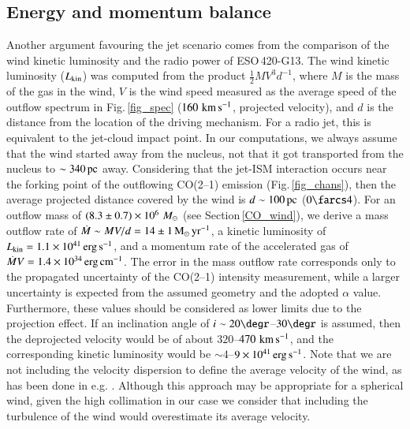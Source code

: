 \documentclass[longauth]{aa}
\newcommand{\msun}{\,\hbox{$M_{\odot}$}}
\newcommand{\kms}{\,\hbox{\hbox{km}\,\hbox{s}$^{-1}$}}
\begin{document}
\subsection{Energy and momentum balance}
Another argument favouring the jet scenario comes from the comparison of the wind kinetic luminosity and the radio power of ESO\,420-G13. The wind kinetic luminosity ($L_{\rm kin}$) was computed from the product $\frac{1}{2} M V^{3} d^{-1}$, where $M$ is the mass of the gas in the wind, $V$ is the wind speed measured as the average speed of the outflow spectrum in Fig.\,\ref{fig_spec} ($160\, \rm{\kms}$, projected velocity), and $d$ is the distance from the location of the driving mechanism. For a radio jet, this is equivalent to the jet-cloud impact point. In our computations, we always assume that the wind started away from the nucleus, not that it got transported from the nucleus to $\sim 340\, \rm{pc}$ away. Considering that the jet-ISM interaction occurs near the forking point of the outflowing CO(2--1) emission (Fig.\,\ref{fig_chans}), then the average projected distance covered by the wind is $d \sim 100\, \rm{pc}$ ($0\farcs4$). For an outflow mass of $(8.3 \pm 0.7) \times 10^6\, \rm{\msun}$ (see Section\,\ref{CO_wind}), we derive a mass outflow rate of $\dot{M} \sim M V/d = 14 \pm 1\, \rm{M_\odot\,yr^{-1}}$, a kinetic luminosity of $L_{\rm kin} = 1.1 \times 10^{41}\, \rm{erg\,s^{-1}}$, and a momentum rate of the accelerated gas of $\dot{M} V = 1.4 \times 10^{34}\, \rm{erg\,cm^{-1}}$. The error in the mass outflow rate corresponds only to the propagated uncertainty of the CO(2--1) intensity measurement, while a larger uncertainty is expected from the assumed geometry and the adopted $\alpha$ value. Furthermore, these values should be considered as lower limits due to the projection effect. If an inclination angle of $i \sim 20\degr$--$30\degr$ is assumed, then the deprojected velocity would be of about $320$--$470\, \rm{\kms}$, and the corresponding kinetic luminosity would be $\sim 4$--$9 \times 10^{41}\, \rm{erg\,s^{-1}}$. Note that we are not including the velocity dispersion to define the average velocity of the wind, as has been done in e.g. . Although this approach may be appropriate for a spherical wind, given the high collimation in our case we consider that including the turbulence of the wind would overestimate its average velocity.
\end{document}

